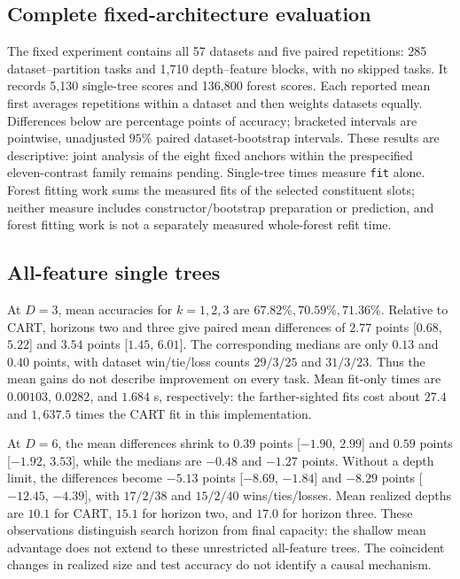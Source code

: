 
\subsection{Complete fixed-architecture evaluation}
The fixed experiment contains all 57 datasets and five paired repetitions:
285 dataset--partition tasks and 1,710 depth--feature blocks, with no skipped
tasks. It records 5,130 single-tree scores and 136,800 forest scores. Each
reported mean first averages repetitions within a dataset and then weights
datasets equally. Differences below are percentage points of accuracy;
bracketed intervals are pointwise, unadjusted $95\%$ paired dataset-bootstrap
intervals. These results are descriptive: joint analysis of the eight fixed
anchors within the prespecified eleven-contrast family remains pending.
Single-tree times measure \texttt{fit} alone. Forest fitting work sums the
measured fits of the selected constituent slots; neither measure includes
constructor/bootstrap preparation or prediction, and forest fitting work is
not a separately measured whole-forest refit time.

\subsection{All-feature single trees}
At $D=3$, mean accuracies for $k=1,2,3$ are $67.82\%,70.59\%,71.36\%$.
Relative to CART, horizons two and three give paired mean differences of
$2.77$ points [$0.68$, $5.22$] and $3.54$ points [$1.45$, $6.01$]. The
corresponding medians are only $0.13$ and $0.40$ points, with dataset
win/tie/loss counts $29/3/25$ and $31/3/23$. Thus the mean gains do not
describe improvement on every task. Mean fit-only times are $0.00103$,
$0.0282$, and $1.684$ s, respectively: the farther-sighted fits cost about
$27.4$ and $1,637.5$ times the CART fit in this implementation.

At $D=6$, the mean differences shrink to $0.39$ points [$-1.90$, $2.99$]
and $0.59$ points [$-1.92$, $3.53$], while the medians are $-0.48$ and
$-1.27$ points. Without a depth limit, the differences become $-5.13$
points [$-8.69$, $-1.84$] and $-8.29$ points [$-12.45$, $-4.39$], with
$17/2/38$ and $15/2/40$ wins/ties/losses. Mean realized depths are $10.1$
for CART, $15.1$ for horizon two, and $17.0$ for horizon three. These
observations distinguish search horizon from final capacity: the shallow
mean advantage does not extend to these unrestricted all-feature trees.
The coincident changes in realized size and test accuracy do not identify
a causal mechanism.

